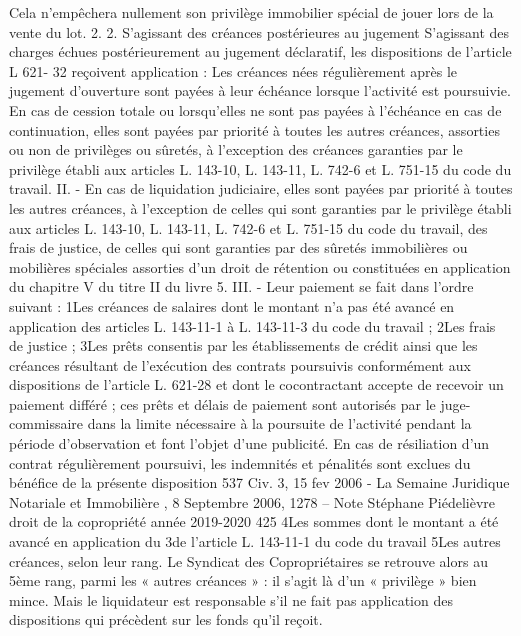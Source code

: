 Cela n’empêchera nullement son privilège immobilier spécial de jouer lors de la vente du lot.
2. 2. S’agissant des créances postérieures au jugement
S’agissant des charges échues postérieurement au jugement déclaratif, les dispositions de l’article L 621-
32 reçoivent application :
Les créances nées régulièrement après le jugement d'ouverture sont payées à leur échéance lorsque l'activité est poursuivie. En cas de cession totale ou lorsqu'elles ne sont pas payées à l'échéance en cas de continuation, elles sont payées par priorité à toutes les autres créances, assorties ou non de privilèges ou sûretés, à l'exception des créances garanties par le privilège établi aux articles L. 143-10, L. 143-11, L. 742-6 et L. 751-15 du code du travail.
II. - En cas de liquidation judiciaire, elles sont payées par priorité à toutes les autres créances, à l'exception de celles qui sont garanties par le privilège établi aux articles L. 143-10, L. 143-11, L. 742-6 et L. 751-15 du code du travail, des frais de justice, de celles qui sont garanties par des sûretés immobilières ou mobilières spéciales assorties d'un droit de rétention ou constituées en application du chapitre V du titre II du livre 5.
III. - Leur paiement se fait dans l'ordre suivant :
1\degres Les créances de salaires dont le montant n'a pas été avancé en application des articles L. 143-11-1 à L. 143-11-3 du code du travail ;
2\degres Les frais de justice ;
3\degres Les prêts consentis par les établissements de crédit ainsi que les créances résultant de l'exécution des contrats poursuivis conformément aux dispositions de l'article L. 621-28 et dont le cocontractant accepte de recevoir un paiement différé ; ces prêts et délais de paiement sont autorisés par le juge-commissaire dans la limite nécessaire à la poursuite de l'activité pendant la période d'observation et font l'objet d'une publicité. En cas de résiliation d'un contrat régulièrement poursuivi, les indemnités et pénalités sont exclues du bénéfice de la présente disposition
537 Civ. 3\degres, 15 fev 2006 - La Semaine Juridique Notariale et Immobilière , 8 Septembre 2006, 1278 – Note Stéphane Piédelièvre
droit de la copropriété année 2019-2020
425
4\degres Les sommes dont le montant a été avancé en application du 3\degres de l'article L. 143-11-1 du code du travail
5\degres Les autres créances, selon leur rang.
Le Syndicat des Copropriétaires se retrouve alors au 5ème rang, parmi les « autres créances » : il s’agit là d’un « privilège » bien mince.
Mais le liquidateur est responsable s’il ne fait pas application des dispositions qui précèdent sur les fonds qu’il reçoit.
